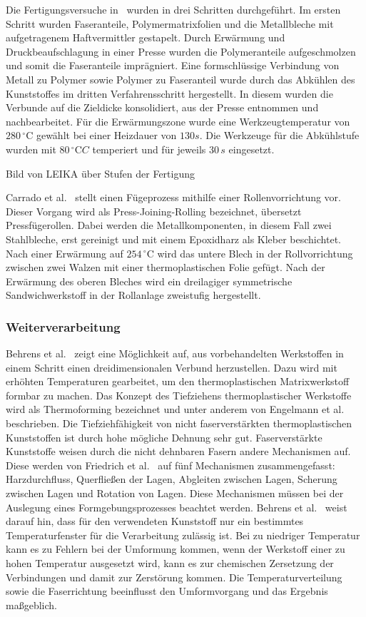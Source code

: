 Die Fertigungsversuche in~\cite{LEIKA.2017} wurden in drei Schritten durchgeführt.
Im ersten Schritt wurden Faseranteile, Polymermatrixfolien und die Metallbleche mit aufgetragenem Haftvermittler gestapelt.
Durch Erwärmung und Druckbeaufschlagung in einer Presse wurden die Polymeranteile aufgeschmolzen und somit die Faseranteile imprägniert.
Eine formschlüssige Verbindung von Metall zu Polymer sowie Polymer zu Faseranteil wurde durch das Abkühlen des Kunststoffes im dritten Verfahrensschritt hergestellt.
In diesem wurden die Verbunde auf die Zieldicke konsolidiert, aus der Presse entnommen und nachbearbeitet.
Für die Erwärmungszone wurde eine Werkzeugtemperatur von $280\, ^\circ \text{C}$ gewählt bei einer Heizdauer von $130 s$.
Die Werkzeuge für die Abkühlstufe wurden mit $80\, ^\circ\text{C} C$ temperiert und für jeweils $30\, s$ eingesetzt\cite{LEIKA.2017}.

Bild von LEIKA über Stufen der Fertigung

Carrado et al.~\cite{Carrado.2010} stellt einen Fügeprozess mithilfe einer Rollenvorrichtung vor.
Dieser Vorgang wird als Press-Joining-Rolling bezeichnet, übersetzt Pressfügerollen.
Dabei werden die Metallkomponenten, in diesem Fall zwei Stahlbleche, erst gereinigt und mit einem Epoxidharz als Kleber beschichtet.
Nach einer Erwärmung auf $254 \, ^\circ \text{C}$ wird das untere Blech in der Rollvorrichtung zwischen zwei Walzen mit einer thermoplastischen Folie gefügt.
Nach der Erwärmung des oberen Bleches wird ein dreilagiger symmetrische Sandwichwerkstoff in der Rollanlage zweistufig hergestellt.

\subsubsection{Weiterverarbeitung}

Behrens et al.~\cite{Behrens.2014} zeigt eine Möglichkeit auf, aus vorbehandelten Werkstoffen in einem Schritt einen dreidimensionalen Verbund herzustellen.
Dazu wird mit erhöhten Temperaturen gearbeitet, um den thermoplastischen Matrixwerkstoff formbar zu machen.
Das Konzept des Tiefziehens thermoplastischer Werkstoffe wird als Thermoforming bezeichnet und unter anderem von Engelmann et al.~\cite{Engelmann.2012} beschrieben.
Die Tiefziehfähigkeit von nicht faserverstärkten thermoplastischen Kunststoffen ist durch hohe mögliche Dehnung sehr gut.
Faserverstärkte Kunststoffe weisen durch die nicht dehnbaren Fasern andere Mechanismen auf.
Diese werden von Friedrich et al.~\cite{Friedrich.1997} auf fünf Mechanismen zusammengefasst: Harzdurchfluss, Querfließen der Lagen, Abgleiten zwischen Lagen, Scherung zwischen Lagen und Rotation von Lagen.
Diese Mechanismen müssen bei der Auslegung eines Formgebungsprozesses beachtet werden.
Behrens et al.~\cite{Behrens.2014} weist darauf hin, dass für den verwendeten Kunststoff nur ein bestimmtes Temperaturfenster für die Verarbeitung zulässig ist.
Bei zu niedriger Temperatur kann es zu Fehlern bei der Umformung kommen, wenn der Werkstoff einer zu hohen Temperatur ausgesetzt wird, kann es zur chemischen Zersetzung der Verbindungen und damit zur Zerstörung kommen.
Die Temperaturverteilung sowie die Faserrichtung beeinflusst den Umformvorgang und das Ergebnis maßgeblich.

